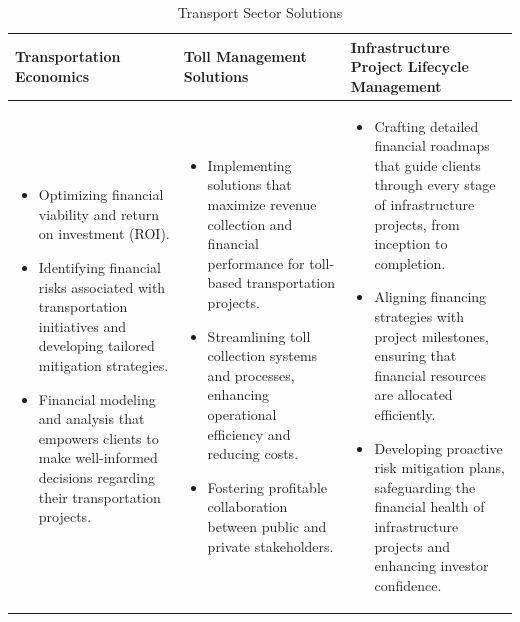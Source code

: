 \begin{table}[H]
    \centering
    \caption{Transport Sector Solutions}
    \label{tab0}
    \begin{tabular}{|>{\raggedright\arraybackslash}p{4.5cm}|>{\raggedright\arraybackslash}p{4.5cm}|>{\raggedright\arraybackslash}p{4.5cm}|}
        \hline
        \rowcolor[gray]{0.8}
        \textbf{Transportation Economics} & \textbf{Toll Management Solutions} & \textbf{Infrastructure Project Lifecycle Management} \\ \hline
        \begin{itemize}
            \item Optimizing financial viability and return on investment (ROI).
            \item Identifying financial risks associated with transportation initiatives and developing tailored mitigation strategies.
            \item Financial modeling and analysis that empowers clients to make well-informed decisions regarding their transportation projects.
        \end{itemize}
        &
        \begin{itemize}
            \item Implementing solutions that maximize revenue collection and financial performance for toll-based transportation projects.
            \item Streamlining toll collection systems and processes, enhancing operational efficiency and reducing costs.
            \item Fostering profitable collaboration between public and private stakeholders.
        \end{itemize}
        &
        \begin{itemize}
            \item Crafting detailed financial roadmaps that guide clients through every stage of infrastructure projects, from inception to completion.
            \item Aligning financing strategies with project milestones, ensuring that financial resources are allocated efficiently.
            \item Developing proactive risk mitigation plans, safeguarding the financial health of infrastructure projects and enhancing investor confidence.
        \end{itemize} \\ \hline
    \end{tabular}
\end{table}




